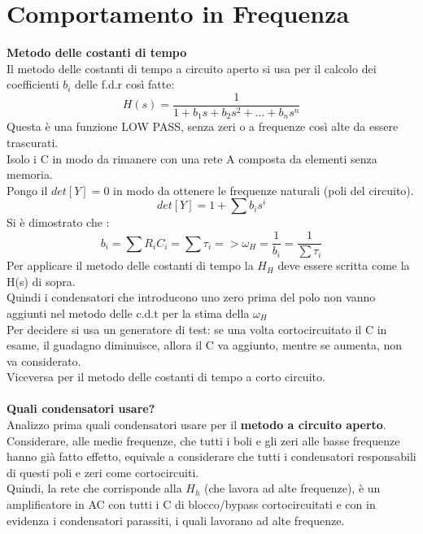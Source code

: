 \documentclass{article}
\begin{document}
\newpage

\section{Comportamento in Frequenza}

\textbf{Metodo delle costanti di tempo}\\
Il metodo delle costanti di tempo a circuito aperto si usa per il calcolo dei coefficienti $b_{i}$ delle f.d.r così fatte:
\begin{equation}
    H(s)=\frac{1}{1+b_{1}s+b_{2}s^2+...+b_{n}s^n}
\end{equation}
Questa è una funzione LOW PASS, senza zeri o a frequenze così alte da essere trascurati.\\
Isolo i C in modo da rimanere con una rete A composta da elementi senza memoria.\\
Pongo il $det[Y]=0$ in modo da ottenere le frequenze naturali (poli del circuito).
\begin{equation}
    det[Y]=1+\sum b_{i}s^i
\end{equation}
Si è dimostrato che :
\begin{equation}
    b_{i}=\sum R_{i}C_{i} = \sum \tau_{i} => \omega_{H}=\frac{1}{b_{i}}=\frac{1}{\sum \tau_{i}}
\end{equation}
Per applicare il metodo delle costanti di tempo la $H_{H}$ deve essere scritta come la H(s) di sopra.\\
Quindi i condensatori che introducono uno zero prima del polo non vanno aggiunti nel metodo delle c.d.t per la stima della $\omega_{H}$\\
Per decidere si usa un generatore di test: se una volta cortocircuitato il C in esame, il guadagno diminuisce, allora il C va aggiunto, mentre se aumenta, non va considerato.\\
Viceversa per il metodo delle costanti di tempo a corto circuito.\\\\
\textbf{Quali condensatori usare?} \\
Analizzo prima quali condensatori usare per il \textbf{metodo a circuito aperto}.\\
Considerare, alle medie frequenze, che tutti i boli e gli zeri alle basse frequenze hanno già fatto effetto, equivale a considerare che tutti i condensatori responsabili di questi poli e zeri come cortocircuiti. \\ Quindi, la rete che corrisponde alla $ H_{h} $ (che lavora ad alte frequenze), è un amplificatore in AC con tutti i C di blocco/bypass cortocircuitati e con in evidenza i condensatori parassiti, i quali lavorano ad alte frequenze. \\
\end{document}
